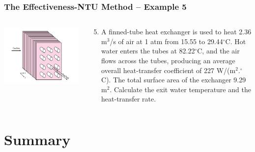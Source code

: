 \documentclass[10pt,compress]{beamer}
\begin{document}
\begin{frame}
  \frametitle{ The Effectiveness-NTU Method -- Example 5}
    \begin{columns}
       \begin{column}[l]{0.58\linewidth}
         \includegraphics[width=1.1\columnwidth,clip]{./Pics/CrossFlowHE_UnmixedFluids_Example}
       \end{column}
       \begin{column}[l]{0.42\linewidth}
          \begin{enumerate}\setcounter{enumi}{4}
              \item A finned-tube heat exchanger is used to heat 2.36 m$^{3}$/s of air at 1 atm from 15.55 to 29.44$^{\circ}$C. Hot water enters the tubes at 82.22$^{\circ}$C, and the air flows across the tubes, producing an average overall heat-transfer coefficient of 227 W/(m$^{2}$.$^{\circ}$C). The total surface area of the exchanger 9.29 m$^{2}$. Calculate the exit water temperature and the heat-transfer rate.
          \end{enumerate}
       \end{column}      
    \end{columns}
\end{frame}



\section{Summary}
\end{document}
